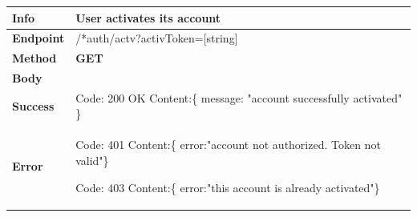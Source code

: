 \begin{table}[H]
\begin{tabular}{|l|p{}|}
\hline
\textbf{Info}             & User activates its account                                                                         \\ \hline
\textbf{Endpoint}    & /*auth/actv?activToken=[string] \\ \hline
\textbf{Method}         &   \textbf{GET}                                                                            \\ \hline

\textbf{Body}  &   \\ \hline
                    
\textbf{Success} &  Code: 200 OK \newline
                    Content:\{\newline 
                    message: "account successfully activated"\newline 
                    \}\\ \hline
\textbf{Error} &  Code: 401 \newline
                  Content:\{\newline
                  error:"account not authorized. Token not valid"\newline\}\newline
                  
                  Code: 403 \newline
                  Content:\{\newline
                  error:"this account is already activated"\newline\}\\\hline

\end{tabular}
\end{table}






